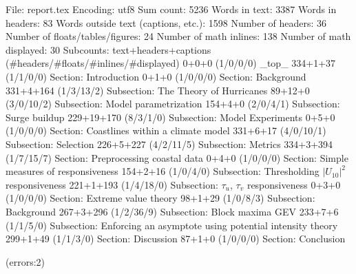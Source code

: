 
File: report.tex
Encoding: utf8
Sum count: 5236
Words in text: 3387
Words in headers: 83
Words outside text (captions, etc.): 1598
Number of headers: 36
Number of floats/tables/figures: 24
Number of math inlines: 138
Number of math displayed: 30
Subcounts:
  text+headers+captions (#headers/#floats/#inlines/#displayed)
  0+0+0 (1/0/0/0) _top_
  334+1+37 (1/1/0/0) Section: Introduction
  0+1+0 (1/0/0/0) Section: Background
  331+4+164 (1/3/13/2) Subsection: The Theory of Hurricanes
  89+12+0 (3/0/10/2) Subsection: Model parametrization
  154+4+0 (2/0/4/1) Subsection: Surge buildup
  229+19+170 (8/3/1/0) Subsection: Model Experiments
  0+5+0 (1/0/0/0) Section: Coastlines within a climate model
  331+6+17 (4/0/10/1) Subsection: Selection
  226+5+227 (4/2/11/5) Subsection: Metrics
  334+3+394 (1/7/15/7) Section: Preprocessing coastal data
  0+4+0 (1/0/0/0) Section: Simple measures of responsiveness
  154+2+16 (1/0/4/0) Subsection: Thresholding $|U_{10}|^2$ responsiveness
  221+1+193 (1/4/18/0) Subsection: $\tau_u$, $\tau_v$ responsiveness
  0+3+0 (1/0/0/0) Section: Extreme value theory
  98+1+29 (1/0/8/3) Subsection: Background
  267+3+296 (1/2/36/9) Subsection: Block maxima GEV
  233+7+6 (1/1/5/0) Subsection: Enforcing an asymptote using potential intensity theory 
  299+1+49 (1/1/3/0) Section: Discussion
  87+1+0 (1/0/0/0) Section: Conclusion

(errors:2)
